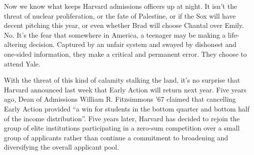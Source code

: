 


Now we know what keeps Harvard admissions officers up at night. It isn't the
threat of nuclear proliferation, or the fate of Palestine, or if the Sox will
have decent pitching this year, or even whether Brad will choose Chantal over
Emily. No. It's the fear that somewhere in America, a teenager may be making
a life-altering decision. Captured by an unfair system and swayed by
dishonest and one-sided information, they make a critical and permanent
error. They choose to attend Yale.

With the threat of this kind of calamity stalking the land, it's no surprise
that Harvard announced last week that Early Action will return next year.
Five years ago, Dean of Admissions William R. Fitzsimmons ’67 claimed that
cancelling Early Action provided ``a win for students in the bottom quarter
and bottom half of the income distribution''. Five years later, Harvard has
decided to rejoin the group of elite institutions participating in a zero-sum
competition over a small group of applicants rather than continue a
commitment to broadening and diversifying the overall applicant pool.


